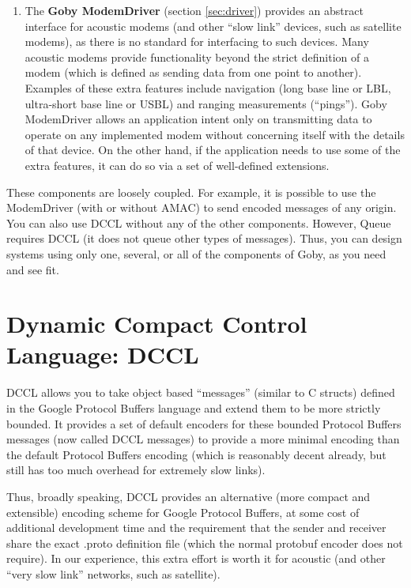 \begin{enumerate}
\item The \textbf{Goby ModemDriver} (section \ref{sec:driver}) provides an abstract interface for acoustic modems (and other ``slow link'' devices, such as satellite modems), as there is no standard for interfacing to such devices. Many acoustic modems provide functionality beyond the strict definition of a modem (which is defined as sending data from one point to another). Examples of these extra features include navigation (long base line or LBL, ultra-short base line or USBL) and ranging measurements (``pings''). Goby ModemDriver allows an application intent only on transmitting data to operate on any implemented modem without concerning itself with the details of that device. On the other hand, if the application needs to use some of the extra features, it can do so via a set of well-defined extensions. 
\end{enumerate}

These components are loosely coupled. For example, it is possible to use the ModemDriver (with or without AMAC) to send encoded messages of any origin. You can also use DCCL without any of the other components. However, Queue requires DCCL (it does not queue other types of messages). Thus, you can design systems using only one, several, or all of the components of Goby, as you need and see fit.


\section{Dynamic Compact Control Language: DCCL} \label{sec:dccl}

DCCL allows you to take object based ``messages'' (similar to C structs) defined in the Google Protocol Buffers language and extend them to be more strictly bounded. It provides a set of default encoders for these bounded Protocol Buffers messages (now called DCCL messages) to provide a more minimal encoding than the default Protocol Buffers encoding (which is reasonably decent already, but still has too much overhead for extremely slow links). 

Thus, broadly speaking, DCCL provides an alternative (more compact and extensible) encoding scheme for Google Protocol Buffers, at some cost of additional development time and the requirement that the sender and receiver share the exact .proto definition file (which the normal protobuf encoder does not require). In our experience, this extra effort is worth it for acoustic (and other ``very slow link'' networks, such as satellite).

